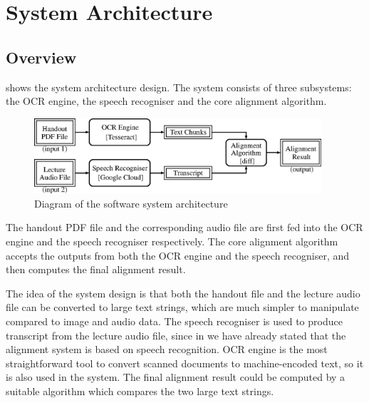 
\chapter{System Architecture}
\label{chap:sys-architecture}

\ifpdf
    \graphicspath{{Chapter3/Figs/Raster/}{Chapter3/Figs/PDF/}{Chapter3/Figs/}}
\else
    \graphicspath{{Chapter3/Figs/Vector/}{Chapter3/Figs/}}
\fi


\section{Overview}

 shows the system architecture design. The system consists of three subsystems: the OCR engine, the speech recogniser and the core alignment algorithm.

\begin{figure}[!ht]
  \centering
  \includegraphics[width=0.95\textwidth]{sys-diagram-full.eps}
  \caption{Diagram of the software system architecture}
  \label{fig:sys-diagram-full}
\end{figure}

The handout PDF file and the corresponding audio file are first fed into the OCR engine and the speech recogniser respectively. The core alignment algorithm accepts the outputs from both the OCR engine and the speech recogniser, and then computes the final alignment result.

The idea of the system design is that both the handout file and the lecture audio file can be converted to large text strings, which are much simpler to manipulate compared to image and audio data. The speech recogniser is used to produce transcript from the lecture audio file, since in  we have already stated that the alignment system is based on speech recognition. OCR engine is the most straightforward tool to convert scanned documents to machine-encoded text, so it is also used in the system. The final alignment result could be computed by a suitable algorithm which compares the two large text strings.


